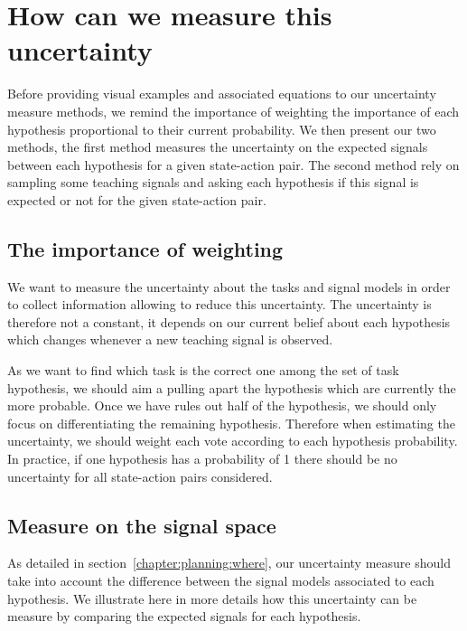 \section{How can we measure this uncertainty}
\label{chapter:planning:how}

Before providing visual examples and associated equations to our uncertainty measure methods, we remind the importance of weighting the importance of each hypothesis proportional to their current probability. We then present our two methods, the first method measures the uncertainty on the expected signals between each hypothesis for a given state-action pair. The second method rely on sampling some teaching signals and asking each hypothesis if this signal is expected or not for the given state-action pair.

\subsection{The importance of weighting}

We want to measure the uncertainty about the tasks and signal models in order to collect information allowing to reduce this uncertainty. The uncertainty is therefore not a constant, it depends on our current belief about each hypothesis which changes whenever a new teaching signal is observed.

As we want to find which task is the correct one among the set of task hypothesis, we should aim a pulling apart the hypothesis which are currently the more probable. Once we have rules out half of the hypothesis, we should only focus on differentiating the remaining hypothesis. Therefore when estimating the uncertainty, we should weight each vote according to each hypothesis probability. In practice, if one hypothesis has a probability of 1 there should be no uncertainty for all state-action pairs considered.

\subsection{Measure on the signal space}

As detailed in section~\ref{chapter:planning:where}, our uncertainty measure should take into account the difference between the signal models associated to each hypothesis. We illustrate here in more details how this uncertainty can be measure by comparing the expected signals for each hypothesis.

